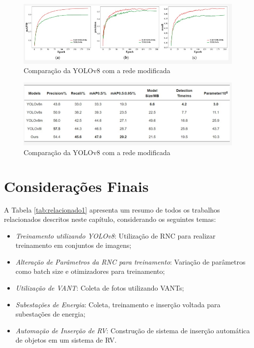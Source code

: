\begin{figure}[!h]
    \center
    \begin{minipage}{1\linewidth}
        \center
        \captionsetup{justification=centering,margin=0.5cm,font=small}
        \includegraphics[width=0.7\linewidth]{img/cap3/chines.jpeg}
        \caption{Comparação da YOLOv8 com a rede modificada}
        \label{fig:chines}
    \end{minipage}
\end{figure}

\begin{figure}[!h]
    \center
    \begin{minipage}{1\linewidth}
        \center
        \captionsetup{justification=centering,margin=0.5cm,font=small}
        \includegraphics[width=0.7\linewidth]{img/cap3/chines-tabela.jpeg}
        \caption{Comparação da YOLOv8 com a rede modificada}
        \label{fig:chines-tabela}
    \end{minipage}
\end{figure}

\section{Considerações Finais}

A Tabela \ref{tab:relacionado1} apresenta um resumo de todos os trabalhos relacionados descritos neste capítulo, considerando os seguintes temas:

\begin{itemize}
    \item \textit{Treinamento utilizando YOLOv8}: Utilização de RNC para realizar treinamento em conjuntos de imagens;
    \item \textit{Alteração de Parâmetros da RNC para treinamento}: Variação de parâmetros como batch size e otimizadores para treinamento;
    \item \textit{Utilização de VANT}: Coleta de fotos utilizando VANTs;
    \item \textit{Subestações de Energia}: Coleta, treinamento e inserção voltada para subestações de energia;
    \item \textit{Automação de Inserção de RV}: Construção de sistema de inserção automática de objetos em um sistema de RV.
\end{itemize}

